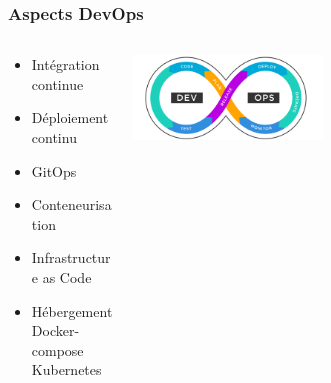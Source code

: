 \documentclass[aspectratio=169]{beamer}
\begin{document}
    \begin{frame}%
        \frametitle{Aspects DevOps}
        \begin{columns}
            \begin{column}{0.5\textwidth}
                \begin{itemize}
                    \item Intégration continue
                    \item Déploiement continu
                    \item GitOps
                    \item Conteneurisation
                    \item Infrastructure as  Code
                    \item Hébergement
                    \subitem Docker-compose
                    \subitem Kubernetes
                \end{itemize}

            \end{column}
            \begin{column}{1\textwidth}
                \begin{flushleft}
                    \includegraphics[width=0.50\textwidth]{imgs/devops}\label{fig:devops2}
                \end{flushleft}
            \end{column}
        \end{columns}
    \end{frame}
\end{document}
